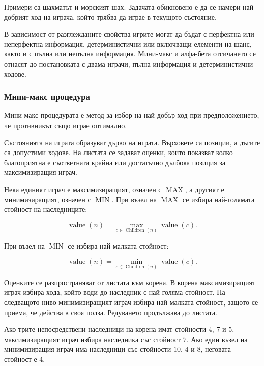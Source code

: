 Примери са шахматът и морският шах. Задачата обикновено е да се намери най-добрият ход на играча, който трябва да играе в текущото състояние.

В зависимост от разглежданите свойства игрите могат да бъдат с перфектна или неперфектна информация, детерминистични или включващи елементи на шанс, както и с пълна или непълна информация. Мини-макс и алфа-бета отсичането се отнасят до постановката с двама играчи, пълна информация и детерминистични ходове.

\subsubsection{Мини-макс процедура}

\begin{defn}
Мини-макс процедурата е метод за избор на най-добър ход при предположението, че противникът също играе оптимално.
\end{defn}

Състоянията на играта образуват дърво на играта. Върховете са позиции, а дъгите са допустими ходове. На листата се задават оценки, които показват колко благоприятна е съответната крайна или достатъчно дълбока позиция за максимизиращия играч.

Нека единият играч е максимизиращият, означен с $\operatorname{MAX}$, а другият е минимизиращият, означен с $\operatorname{MIN}$. При възел на $\operatorname{MAX}$ се избира най-голямата стойност на наследниците:

\[
\operatorname{value}(n)=
\max_{c\in\operatorname{Children}(n)}
\operatorname{value}(c).
\]

При възел на $\operatorname{MIN}$ се избира най-малката стойност:

\[
\operatorname{value}(n)=
\min_{c\in\operatorname{Children}(n)}
\operatorname{value}(c).
\]

Оценките се разпространяват от листата към корена. В корена максимизиращият играч избира хода, който води до наследник с най-голяма стойност. На следващото ниво минимизиращият играч избира най-малката стойност, защото се приема, че действа в своя полза. Редуването продължава до листата.

\begin{example}
Ако трите непосредствени наследници на корена имат стойности $4$, $7$ и $5$, максимизиращият играч избира наследника със стойност $7$. Ако един възел на минимизиращия играч има наследници със стойности $10$, $4$ и $8$, неговата стойност е $4$.
\end{example}

